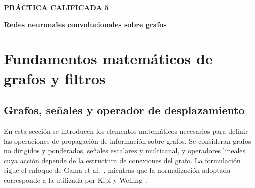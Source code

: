 \documentclass[a4paper,openany,oneside,10pt]{report}
\theoremstyle{pnlTeorema}
\theoremstyle{pnlDefinicion}
\theoremstyle{pnlObservacion}
\newcommand{\TipoTrabajo}{Práctica Calificada 5}
\newcommand{\TituloTrabajo}{Redes neuronales convolucionales sobre grafos}
\begin{document}
\begin{titlepage}
\vspace{0.75cm}
\begin{center}
  {\sffamily\fontsize{11}{13}\selectfont\bfseries\color{uniGuinda}\MakeUppercase{\TipoTrabajo}\par}
  \vspace{0.16cm}
  {\fontsize{16}{20}\selectfont\bfseries\color{uniAzul}\TituloTrabajo\par}
\end{center}

\vspace{0.35cm}
\noindent{\color{uniBorde}\rule{\linewidth}{0.7pt}}

\vspace{0.25cm}
\par
\vspace{0.10cm}
\begingroup
  \makeatletter
  \makeatother
\endgroup

\end{titlepage}
\restoregeometry


\chapter{Fundamentos matemáticos de grafos y filtros}
\label{cap:fundamentos-grafos}

\section{Grafos, señales y operador de desplazamiento}\label{sec:grafos}

En esta sección se introducen los elementos matemáticos necesarios para definir las operaciones de propagación de información sobre grafos. Se consideran grafos no dirigidos y ponderados, señales escalares y multicanal, y operadores lineales cuya acción depende de la estructura de conexiones del grafo. La formulación sigue el enfoque de Gama et al.~\cite{gama2020}, mientras que la normalización adoptada corresponde a la utilizada por Kipf y Welling~\cite{kipf2017}.
\end{document}
